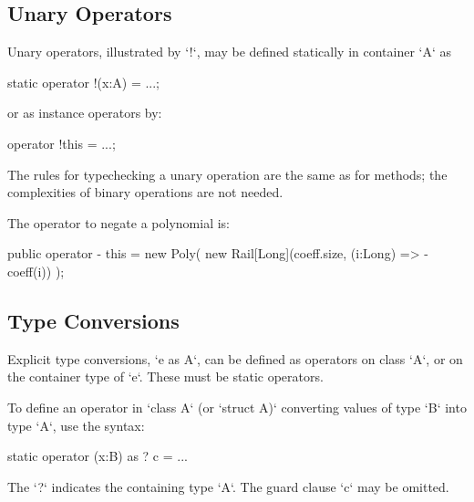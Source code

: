 \subsection{Unary Operators}

Unary operators,  illustrated by \xcd`!`, may be defined statically in
container 
\xcd`A` as 
\begin{xten}
static operator !(x:A) = ...;
\end{xten}
or as instance operators by: 
\begin{xten}
operator !this = ...;
\end{xten}


The rules for typechecking a unary operation are the same as for methods; the
complexities of binary operations are not needed.

\begin{ex}
The operator to negate a polynomial is: 

\begin{xten}
  public operator - this = new Poly(
    new Rail[Long](coeff.size, (i:Long) => -coeff(i))
    );
\end{xten}



\end{ex}


\subsection{Type Conversions}
\label{sect:type-conv}


Explicit type conversions, \xcd`e as A`, can be defined as operators on
class \xcd`A`, or on the container type of \xcd`e`.  These must be static
operators.  

To define an operator in \xcd`class A` (or \xcd`struct A)` converting values
of type \xcd`B` into type \xcd`A`, use the syntax: 
\begin{xten}
static operator (x:B) as ? {c} = ... 
\end{xten}
The \xcd`?` indicates the containing type \xcd`A`.  
The guard clause \xcd`{c}` may be omitted.



